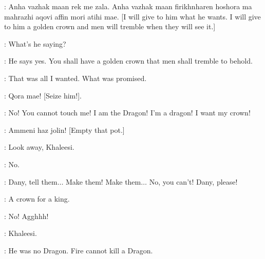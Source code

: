 \DROGO: Anha vazhak maan rek me zala. Anha vazhak maan firikhnharen hoshora ma mahrazhi aqovi affin mori atihi mae. [I will give to him what he wants. I will give to him a golden crown and men will tremble when they will see it.] 

\VISERYS: What's he saying? 

\DAENERYS: He says yes. You shall have a golden crown that men shall tremble to behold. 

\VISERYS: That was all I wanted. What was promised. 

\DROGO: Qora mae! [Seize him!]. 


\VISERYS:  No! You cannot touch me! I am the Dragon! I'm a dragon! I want my crown! 

\DROGO: Ammeni haz jolin! [Empty that pot.] 


\JORAH: Look away, Khaleesi. 

\DAENERYS: No. 

\VISERYS: Dany, tell them$\ldots$ Make them! Make them$\ldots$ No, you can't! Dany, please! 


\DROGO: A crown for a king. 


\VISERYS: No! Agghhh! 


\JORAH: Khaleesi. 

\DAENERYS: He was no Dragon. Fire cannot kill a Dragon. 



